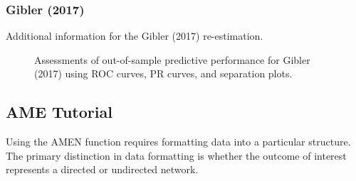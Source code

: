\subsubsection*{Gibler (2017)}

Additional information for the Gibler (2017) re-estimation. 


\FloatBarrier

\begin{figure}
	\centering   
	\caption{Assessments of out-of-sample predictive performance for Gibler (2017) using ROC curves, PR curves, and separation plots.}
\end{figure}
\FloatBarrier
\clearpage

\subsection*{AME Tutorial}

Using the AMEN function requires formatting data into a particular structure. The primary distinction in data formatting is whether the outcome of interest represents a directed or undirected network. 

